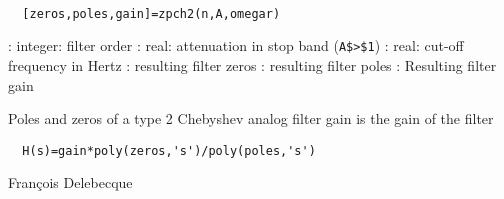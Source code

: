 
\begin{mandesc}
   \\ %
\end{mandesc}
\begin{calling_sequence}
\begin{verbatim}
  [zeros,poles,gain]=zpch2(n,A,omegar)  
\end{verbatim}
\end{calling_sequence}
\begin{parameters}
  \begin{varlist}
    : integer: filter order
    : real: attenuation in stop band (\verb!A$>$1!)
    : real: cut-off frequency in Hertz
    : resulting filter zeros
    : resulting filter poles
    : Resulting filter gain
  \end{varlist}
\end{parameters}
\begin{mandescription}
  Poles and zeros of a type 2 Chebyshev analog filter
  gain is the gain of the filter
\begin{verbatim}
  H(s)=gain*poly(zeros,'s')/poly(poles,'s')
\end{verbatim}
\end{mandescription}
\begin{authors}
  Fran\c{c}ois Delebecque  
\end{authors}
